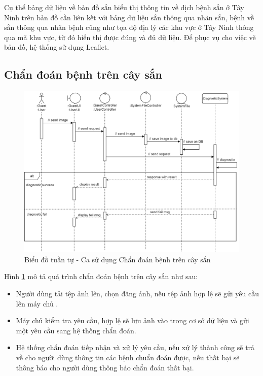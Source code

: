 \documentclass[./../main.tex]{subfiles}
\begin{document}
Cụ thể bảng dữ liệu về bản đồ sắn biểu thị thông tin về dịch bệnh sắn ở Tây Ninh trên bản đồ cần liên kết với bảng dữ liệu sắn thông qua nhãn sắn, bệnh về sắn thông qua nhãn bệnh cũng như tọa độ địa lý các khu vực ở Tây Ninh thông qua mã khu vực, từ đó hiển thị được đúng và đủ dữ liệu. Để phục vụ cho việc vẽ bản đồ, hệ thống sử dụng Leaflet.

\subsection{Chẩn đoán bệnh trên cây sắn}
\begin{figure}[H]
	\centering
	\includegraphics[width=\linewidth]{./img/uc12.png}
	\caption{\label{tab:seq-uc7}Biểu đồ tuần tự - Ca sử dụng Chẩn đoán bệnh trên cây sắn}
\end{figure}
Hình \ref{tab:seq-uc7} mô tả quá trình chẩn đoán bệnh trên cây sắn như sau:
\begin{itemize}
    \item Người dùng tải tệp ảnh lên, chọn đăng ảnh, nếu tệp ảnh hợp lệ sẽ gửi yêu cầu lên máy chủ .
    \item Máy chủ kiểm tra yêu cầu, hợp lệ sẽ lưu ảnh vào trong cơ sở dữ liệu và gửi một yêu cầu sang hệ thống chẩn đoán.
    \item Hệ thống chẩn đoán tiếp nhận và xử lý yêu cầu, nếu xử lý thành công sẽ trả về cho người dùng thông tin các bệnh chuẩn đoán được, nếu thất bại sẽ thông báo cho người dùng thông báo chẩn đoán thất bại.
\end{itemize}
\end{document}
